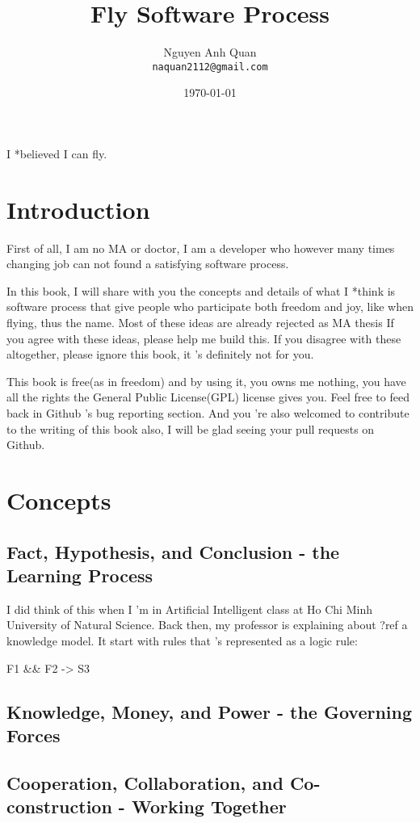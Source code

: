 \documentclass[10pt,a4paper]{book}
\newenvironment{dedication}
{
   \clearpage
   \thispagestyle{empty}
   \vspace*{\stretch{1}}
   \itshape
   \raggedright
}%
{
   \par
   \vspace*{\stretch{3}}
   \clearpage
}
\begin{document}
\frontmatter

\title{Fly Software Process}
\author{Nguyen Anh Quan\\
  \texttt{naquan2112@gmail.com}}
\date{\today}
\maketitle

\begin{dedication}
  I *believed I can fly.
\end{dedication}

\tableofcontents

\mainmatter

\chapter{Introduction}

First of all, I am no MA or doctor, I am a developer who however many times
changing job can not found a satisfying software process.

In this book, I will share with you the concepts and details of what I *think
is software process that give people who participate both freedom and joy, like
when flying, thus the name. Most of these ideas are already rejected as MA
thesis If you agree with these ideas, please help me build this. If you
disagree with these altogether, please ignore this book, it 's definitely not
for you.

This book is free(as in freedom) and by using it, you owns me nothing, you have
all the rights the General Public License(GPL) license gives you. Feel free to feed back in Github 's
bug reporting section. And you 're also welcomed to contribute to the writing
of this book also, I will be glad seeing your pull requests on Github.

\chapter{Concepts}
\section[Learning Process]{Fact, Hypothesis, and Conclusion - the Learning Process}

I did think of this when I 'm in Artificial Intelligent class at Ho Chi Minh
University of Natural Science. Back then, my professor is explaining about ?ref
a knowledge model. It start with rules that 's represented as a logic rule:

F1 && F2 -> S3
\lipsum[1-20]

\section[Governing Forces]{Knowledge, Money, and Power - the Governing Forces}

\lipsum[1-20]

\section[Working Together]{Cooperation, Collaboration, and Co-construction - Working Together}

\lipsum[1-20]

\backmatter
\end{document}
